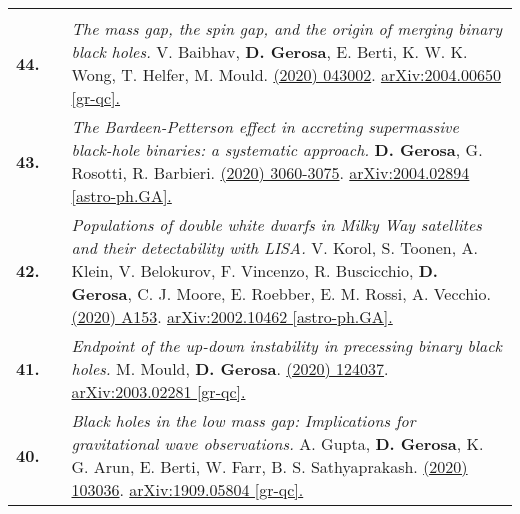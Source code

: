 {\begin{longtable}{rp{0.3cm}p{15.8cm}}
\vspace{0.09cm}\\
%
\textbf{44.} & & \textit{The mass gap, the spin gap, and the origin of merging binary black holes.}
\newline{}
V. Baibhav, \textbf{D. Gerosa}, E. Berti, K. W. K. Wong, T. Helfer, M. Mould.
\newline{}
\href{https://journals.aps.org/prd/abstract/10.1103/PhysRevD.102.043002}{\prd 102 (2020) 043002}. \href{https://arxiv.org/abs/2004.00650}{arXiv:2004.00650 [gr-qc].}
\vspace{0.09cm}\\
%
\textbf{43.} & & \textit{The Bardeen-Petterson effect in accreting supermassive black-hole binaries: a systematic approach.}
\newline{}
\textbf{D. Gerosa}, G. Rosotti, R. Barbieri.
\newline{}
\href{https://doi.org/10.1093/mnras/staa1693}{\mnras 496 (2020) 3060-3075}. \href{https://arxiv.org/abs/2004.02894}{arXiv:2004.02894 [astro-ph.GA].}
\vspace{0.09cm}\\
%
\textbf{42.} & & \textit{Populations of double white dwarfs in Milky Way satellites and their detectability with LISA.}
\newline{}
V. Korol, S. Toonen, A. Klein, V. Belokurov, F. Vincenzo, R. Buscicchio, \textbf{D. Gerosa}, C. J. Moore, E. Roebber, E. M. Rossi, A. Vecchio.
\newline{}
\href{https://www.aanda.org/articles/aa/abs/2020/06/aa37764-20/aa37764-20.html}{\aap 638 (2020) A153}. \href{https://arxiv.org/abs/2002.10462}{arXiv:2002.10462 [astro-ph.GA].}
\vspace{0.09cm}\\
%
\textbf{41.} & & \textit{Endpoint of the up-down instability in precessing binary black holes.}
\newline{}
M. Mould, \textbf{D. Gerosa}.
\newline{}
\href{https://journals.aps.org/prd/abstract/10.1103/PhysRevD.101.124037}{\prd 101 (2020) 124037}. \href{https://arxiv.org/abs/2003.02281}{arXiv:2003.02281 [gr-qc].}
\vspace{0.09cm}\\
%
\textbf{40.} & & \textit{Black holes in the low mass gap: Implications for gravitational wave observations.}
\newline{}
A. Gupta, \textbf{D. Gerosa}, K. G. Arun, E. Berti, W. Farr, B. S. Sathyaprakash.
\newline{}
\href{https://journals.aps.org/prd/abstract/10.1103/PhysRevD.101.103036}{\prd 101 (2020) 103036}. \href{https://arxiv.org/abs/1909.05804}{arXiv:1909.05804 [gr-qc].}

\end{longtable}}
